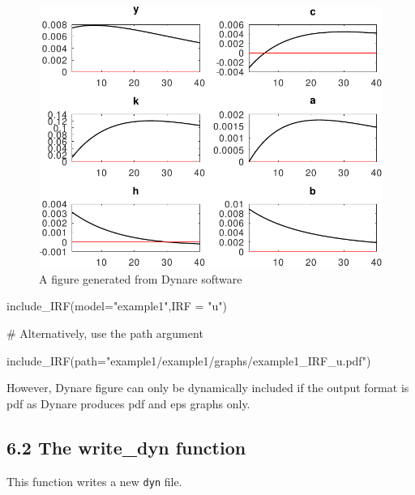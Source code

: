\documentclass[
  12pt,
  legalpaperpaper,
  DIV=11,
  numbers=noendperiod]{scrartcl}
\newenvironment{Shaded}{\begin{snugshade}}{\end{snugshade}}
\newcommand{\AttributeTok}[1]{\textcolor[rgb]{0.40,0.45,0.13}{#1}}
\newcommand{\CommentTok}[1]{\textcolor[rgb]{0.37,0.37,0.37}{#1}}
\newcommand{\FunctionTok}[1]{\textcolor[rgb]{0.28,0.35,0.67}{#1}}
\newcommand{\NormalTok}[1]{\textcolor[rgb]{0.00,0.23,0.31}{#1}}
\newcommand{\StringTok}[1]{\textcolor[rgb]{0.13,0.47,0.30}{#1}}
\begin{document}
\begin{figure}

{\centering \includegraphics{example1/example1/graphs/example1_IRF_u.pdf}

}

\caption{A figure generated from Dynare software}

\end{figure}

\begin{Shaded}
\begin{Highlighting}[]
\FunctionTok{include\_IRF}\NormalTok{(}\AttributeTok{model=}\StringTok{"example1"}\NormalTok{,}\AttributeTok{IRF =} \StringTok{"u"}\NormalTok{)}

\CommentTok{\# Alternatively, use the path argument }

\FunctionTok{include\_IRF}\NormalTok{(}\AttributeTok{path=}\StringTok{"example1/example1/graphs/example1\_IRF\_u.pdf"}\NormalTok{)}
\end{Highlighting}
\end{Shaded}

However, Dynare figure can only be dynamically included if the output
format is pdf as Dynare produces pdf and eps graphs only.

\hypertarget{the-write_dyn-function}{%
\subsection{6.2 The write\_dyn function}\label{the-write_dyn-function}}

This function writes a new \texttt{dyn} file.
\end{document}
